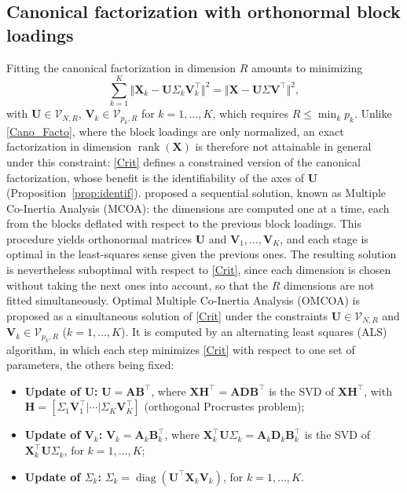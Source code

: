 \documentclass[11pt]{article}
\DeclareMathOperator{\diag}{diag}
\DeclareMathOperator{\rank}{rank}
\newcommand{\X}{\mathbf{X}}
\newcommand{\U}{\mathbf{U}}
\newcommand{\V}{\mathbf{V}}
\newcommand{\Stiefel}[2]{\mathcal V_{#1,#2}}
\begin{document}
\subsection{Canonical factorization with orthonormal block loadings}

Fitting the canonical factorization in dimension $R$ amounts to minimizing
\begin{equation}
	\sum_{k=1}^K\Vert \X_k - \U\Sigma_k \V_k^\intercal\Vert^2= \Vert \X- \U \Sigma \V^\intercal\Vert^2, \label{Crit}
\end{equation}
with $\U\in\Stiefel{N}{R}$, $\V_k\in\Stiefel{p_k}{R}$ for $k=1,\ldots,K$, which requires $R\leq\min_kp_k$. Unlike \eqref{Cano_Facto}, where the block loadings are only normalized, an exact factorization in dimension $\rank(\X)$ is therefore not attainable in general under this constraint: \eqref{Crit} defines a constrained version of the canonical factorization, whose benefit is the identifiability of the axes of $\U$ (Proposition~\ref{prop:identif}).\citet{chessel1996} proposed a sequential solution, known as Multiple Co-Inertia Analysis (MCOA): the dimensions are computed one at a time, each from the blocks deflated with respect to the previous block loadings. This procedure yields orthonormal matrices $\U$ and $\V_1,\ldots,\V_K$, and each stage is optimal in the
least-squares sense given the previous ones. The resulting solution is nevertheless suboptimal with respect to \eqref{Crit}, since each dimension is chosen without taking the next ones into account, so that the $R$ dimensions are not fitted simultaneously.
Optimal Multiple Co-Inertia Analysis (OMCOA) is proposed as a simultaneous solution of \eqref{Crit} under the constraints $\U\in \Stiefel{N}{R}$ and $\V_k\in \Stiefel{p_k}{R}$ ($k=1,\ldots,K$). It is computed by an alternating least squares (ALS) algorithm, in which each step minimizes \eqref{Crit} with respect to one set of parameters, the others being fixed:
\begin{itemize}
  \item \textbf{Update of $\U$:} $\U=\mathbf A\mathbf B^\intercal$, where $\X\mathbf H^\intercal=\mathbf A\mathbf D\mathbf B^\intercal$ is the SVD of
        $\X\mathbf H^\intercal$, with $\mathbf H=[\Sigma_1\V_1^\intercal|\cdots|\Sigma_K\V_K^\intercal]$ (orthogonal Procrustes problem);
  \item \textbf{Update of $\V_k$:} $\V_k=\mathbf A_k\mathbf B_k^\intercal$, where $\X_k^\intercal\U\Sigma_k=\mathbf A_k\mathbf D_k\mathbf B_k^\intercal$
        is the SVD of $\X_k^\intercal\U\Sigma_k$, for $k=1,\ldots,K$;
  \item \textbf{Update of $\Sigma_k$:} $\Sigma_k=\diag(\U^\intercal\X_k\V_k)$, for $k=1,\ldots,K$.
\end{itemize}
\end{document}
